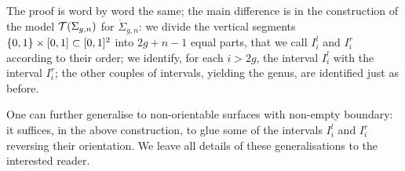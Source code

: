 The proof is word by word the same; the main difference is in the construction of the
model $\mathcal{T}(\Sigma_{g,n})$ for $\mathring{\Sigma}_{g,n}$: we divide the
vertical segments $\left\{0,1\right\}\times[0,1]\subset[0,1]^2$
into $2g+n-1$ equal parts, that we call $I_i^l$ and $I_i^r$ according to their order;
we identify, for each $i>2g$, the interval $I_i^l$ with the interval $I_i^r$;
the other couples of intervals, yielding the genus, are identified just as before.

One can further generalise to non-orientable surfaces with non-empty boundary: it suffices,
in the above construction, to glue some of the intervals $I_i^l$ and $I_i^r$ reversing their
orientation. We leave all details of these generalisations to the interested reader.